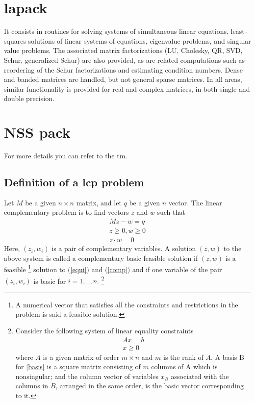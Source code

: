 \section{\ac{lapack}}
It consists in routines for solving systems of simultaneous linear equations, least-squares solutions of linear systems of equations, eigenvalue problems, and singular value problems. The associated matrix factorizations (LU, Cholesky, QR, SVD, Schur, generalized Schur) are also provided, as are related computations such as reordering of the Schur factorizations and estimating condition numbers. Dense and banded matrices are handled, but not general sparse matrices. In all areas, similar functionality is provided for real and complex matrices, in both single and double precision.

\section{NSS pack}

For more details you can refer to the \ac{tm}.

\subsection{Definition of a \acs{lcp} problem}
Let $M$ be a given $n\times n$ matrix, and let $q$ be a given $n$ vector. The linear complementary problem is to find vectors $z$ and $w$ such that
\begin{eqnarray}
M z - w = q \label{equi}\\
z \ge 0, w \ge 0\label{comp}\\
z \cdot w = 0 \label{pdt}
\end{eqnarray}
%
Here, $(z_{i},w_{i})$ is a pair of complementary variables. A solution $(z,w)$ to the above system is called a complementary basic feasible solution if $(z,w)$ is a feasible%
\footnote{A numerical vector that satisfies all the constraints and restrictions in the problem is said a feasible solution.}
solution to $($\ref{equi}$)$ and $($\ref{comp}$)$ and if one variable of the pair $(z_{i},w_{i})$ is  basic for $i=1,..,n.$
\footnote{Consider the following system of linear equality constraints 
\begin{eqnarray}
A x = b \label{basis} \\
x \geq 0
\end{eqnarray}
where $A$ is a given matrix of order $m\times n$ and $m$ is the rank of $A$.
A basis B for \ref{basis} is a square matrix consisting of $m$ columns of A which is nonsingular; and the column vector of variables $x_{B}$ associated with the columns in $B$, arranged in the same order, is the basic vector corresponding to it.
} 



